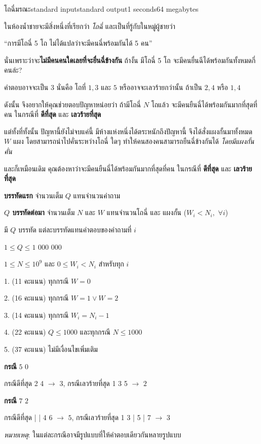 \documentclass[11pt,a4paper]{article}
\begin{document}
\begin{problem}{โถฉี่มรณะ}{standard input}{standard output}{1 seconds}{64 megabytes}

ในห้องน้ำชายจะมีสิ่งหนึ่งที่เรียกว่า \textit{โถฉี่} และเป็นที่รู้กับในหมู่ผู้ชายว่า

``การมีโถฉี่ 5 โถ ไม่ได้แปลว่าจะมีคนฉี่พร้อมกันได้ 5 คน''

นั่นเพราะว่าจะ\textbf{ไม่มีคนคนใดเลยที่จะยื่นฉี่ข้างกัน}
ถ้างั้น มีโถฉี่ 5 โถ จะมีคนยื่นฉีได้พร้อมกันทั้งหมดกี่คนล่ะ?

คำตอบอาจจะเป็น $3$ นั่นคือ โถที่ $1, 3$ และ $5$ หรืออาจจะเลวร้ายกว่านั้น ถ้าเป็น $2, 4$ หรือ $1, 4$

ดังนั้น จึงอยากให้คุณช่วยตอบปัญหาหน่อยว่า ถ้ามีโถฉี่ $N$ โถแล้ว
จะมีคนยืนฉี่ได้พร้อมกันมากที่สุดที่คน ในกรณีที่ \textbf{ดีที่สุด} และ \textbf{เลวร้ายที่สุด}

แต่ทั้งที่ทั้งนั้น ปัญหานี้ยังไม่จบแค่นี้ มีห้างแห่งหนึ่งได้ตระหนักถึงปัญหานี้ จึงได้สั่งแผงกั้นมาทั้งหมด
$W$ แผง โดยสามารถนำไปคั่นระหว่างโถฉี่ ใดๆ ทำให้คนสองคนสามารถยืนฉี่ข้างกันได้
\textit{โดยมีแผงกั้นคั่น}

และก็เหมือนเดิม คุณต้องหาว่าจะมีคนยืนฉี่ได้พร้อมกันมากที่สุดที่คน
ในกรณีที่ \textbf{ดีที่สุด} และ \textbf{เลวร้ายที่สุด}

\InputFile

\textbf{บรรทัดแรก} จำนวนเต็ม $Q$ แทนจำนวนคำถาม

\textbf{$Q$ บรรทัดต่อมา} จำนวนเต็ม $N$ และ $W$ แทนจำนวนโถฉี่ และ แผงกั้น ($W_i < N_i,$ $\forall i$)

\OutputFile

มี $Q$ บรรทัด แต่ละบรรทัดแทนคำตอบของคำถามที่ $i$

\Constraints

$1 \le Q \le 1$ $000$ $000$

$1 \le N \le 10^9$ และ $0 \le W_i < N_i$ สำหรับทุก $i$

\Subtasks

1. (11 คะแนน) ทุกกรณี $W = 0$

2. (16 คะแนน) ทุกกรณี $W = 1 \vee W = 2$

3. (14 คะแนน) ทุกกรณี $W_i = N_i - 1$

4. (22 คะแนน) $Q \le 1000$ และทุกกรณี $N \le 1000$

5. (37 คะแนน) ไม่มีเงื่อนไขเพิ่มเติม

\Examples

\begin{example}
%
\end{example}

\Note

\textbf{กรณี} $5$ $0$

กรณีดีที่สุด  2  4  $\rightarrow$ $3$,
กรณีเลวร้ายที่สุด 1  3  5 $\rightarrow$ $2$

\textbf{กรณี} $7$ $2$

กรณีดีที่สุด  |  |  4  6  $\rightarrow$ $5$,
กรณีเลวร้ายที่สุด 1  3 |  5 |  7 $\rightarrow$ $3$

\textit{หมายเหตุ}: ในแต่ละกรณีอาจมีรูปแบบที่ให้คำตอบเดียวกันหลายรูปแบบ

\end{problem}
\end{document}

